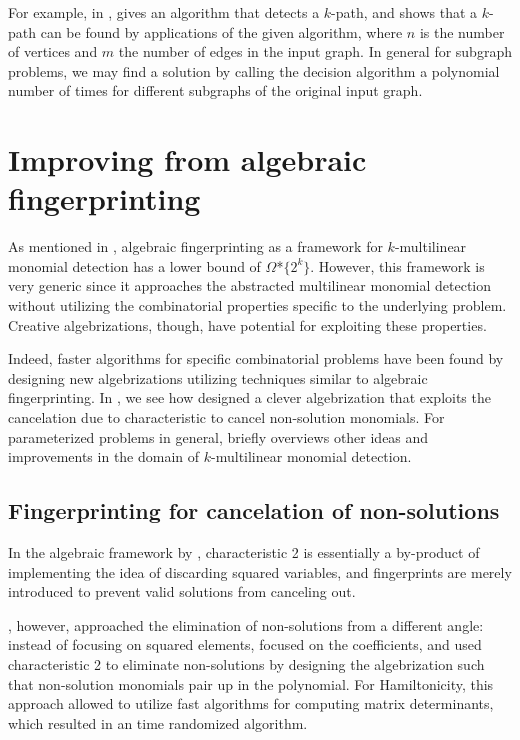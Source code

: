 For example, in \cite{Koutis08}, 
\citeauthor{Koutis08} gives an algorithm that detects a $k$-path, and shows that a 
$k$-path can be found by  applications of the given
algorithm, where $n$ is the number of vertices and $m$ the number of edges in the input graph. 
In general for subgraph problems, we may find a solution by calling the decision 
algorithm a polynomial number of times for different subgraphs of the original input graph.

\section{Improving from algebraic fingerprinting}
\label{sect:improvements}

As mentioned in , 
algebraic fingerprinting as a framework 
for $k$-multilinear monomial detection has a lower bound of $\Omega$*$\{2^k\}$. 
However, this framework is very generic since it 
approaches the abstracted multilinear monomial detection without 
utilizing the combinatorial properties specific to the underlying problem. 
Creative algebrizations, though, 
have potential for exploiting these properties.

Indeed, faster algorithms for specific combinatorial problems 
have been found by designing new algebrizations utilizing techniques 
similar to algebraic fingerprinting. In , 
we see how \textcite{Björklund14} designed a clever algebrization that  
exploits the cancelation due to characteristic to cancel non-solution monomials. 
For parameterized problems in general, 
briefly overviews other ideas and 
improvements in the domain of $k$-multilinear monomial detection.

\subsection{Fingerprinting for cancelation of non-solutions}
\label{sect:cancel_nonsolutions}

In the algebraic framework by \citeauthor{KouWil09}, 
characteristic 2 is essentially a by-product of implementing 
the idea of discarding squared variables, and fingerprints are merely 
introduced to prevent valid solutions from canceling out.

\textcite{Björklund14}, however, approached the elimination of 
non-solutions from a different angle: instead of focusing on squared elements, 
\citeauthor{Björklund14} focused on the coefficients, 
and used characteristic 2 to eliminate non-solutions by designing 
the algebrization such that non-solution monomials pair up in the polynomial. 
For Hamiltonicity, this approach allowed \citeauthor{Björklund14} to utilize 
fast algorithms for computing matrix determinants, which resulted in an 
 time randomized algorithm.

